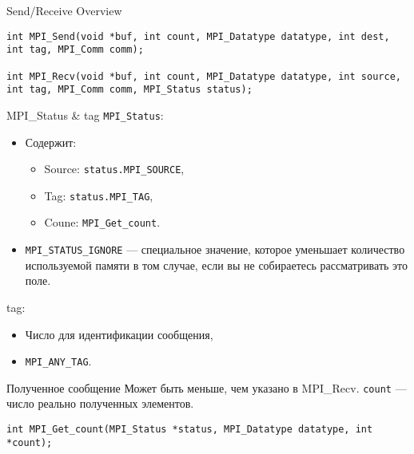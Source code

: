 \begin{frame}[fragile]{Send/Receive Overview}
\begin{lstlisting}
int MPI_Send(void *buf, int count, MPI_Datatype datatype, int dest, int tag, MPI_Comm comm);

int MPI_Recv(void *buf, int count, MPI_Datatype datatype, int source, int tag, MPI_Comm comm, MPI_Status status);
\end{lstlisting}
\end{frame}

\begin{frame}{MPI_Status \& tag}
\texttt{MPI_Status}:

\begin{itemize}
    \item Содержит:
    \begin{itemize}
        \item Source: \texttt{status.MPI_SOURCE},
        \item Tag:  \texttt{status.MPI_TAG},
        \item Coune: \texttt{MPI_Get_count}.
    \end{itemize}
    \item \texttt{MPI_STATUS_IGNORE} --- специальное значение, которое уменьшает количество используемой памяти в том случае, если вы не собираетесь рассматривать это поле.
\end{itemize}
\vfill
tag:
\begin{itemize}
    \item Число для идентификации сообщения,
    \item \texttt{MPI_ANY_TAG}.
\end{itemize}
\end{frame}

\begin{frame}[fragile]{Полученное сообщение}
Может быть меньше, чем указано в MPI_Recv.
\vfill
\texttt{count} --- число реально полученных элементов.
\vfill
\begin{lstlisting}
int MPI_Get_count(MPI_Status *status, MPI_Datatype datatype, int *count);
\end{lstlisting}
\end{frame}

